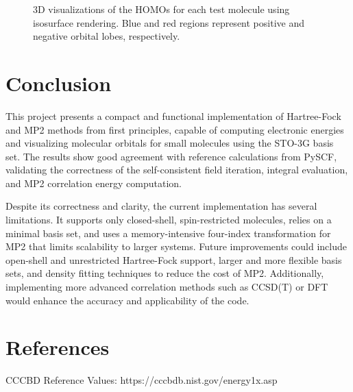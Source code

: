 \documentclass[12pt]{article}
\begin{document}
\begin{figure}[H]
    \caption{3D visualizations of the HOMOs for each test molecule using isosurface rendering. Blue and red regions represent positive and negative orbital lobes, respectively.}
\end{figure}

\section{Conclusion}

This project presents a compact and functional implementation of Hartree-Fock and MP2 methods from first principles, capable of computing electronic energies and visualizing molecular orbitals for small molecules using the STO-3G basis set. The results show good agreement with reference calculations from PySCF, validating the correctness of the self-consistent field iteration, integral evaluation, and MP2 correlation energy computation.

Despite its correctness and clarity, the current implementation has several limitations. It supports only closed-shell, spin-restricted molecules, relies on a minimal basis set, and uses a memory-intensive four-index transformation for MP2 that limits scalability to larger systems. Future improvements could include open-shell and unrestricted Hartree-Fock support, larger and more flexible basis sets, and density fitting techniques to reduce the cost of MP2. Additionally, implementing more advanced correlation methods such as CCSD(T) or DFT would enhance the accuracy and applicability of the code.

\section*{References}
CCCBD Reference Values: https://cccbdb.nist.gov/energy1x.asp
\end{document}

